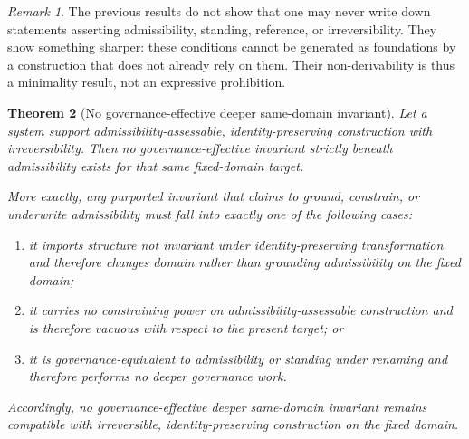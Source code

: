 \documentclass[11pt]{article}
\newtheorem{theorem}{Theorem}[section]
\theoremstyle{definition}
\theoremstyle{remark}
\newtheorem{remark}[theorem]{Remark}
\begin{document}
\begin{remark}
The previous results do not show that one may never write down statements asserting admissibility, standing, reference, or irreversibility. They show something sharper: these conditions cannot be generated as foundations by a construction that does not already rely on them. Their non-derivability is thus a minimality result, not an expressive prohibition.
\end{remark}
\begin{theorem}[No governance-effective deeper same-domain invariant]\label{thm:no-deeper-invariant}
Let a system support admissibility-assessable, identity-preserving construction with irreversibility. Then no governance-effective invariant strictly beneath admissibility exists for that same fixed-domain target.

More exactly, any purported invariant that claims to ground, constrain, or underwrite admissibility must fall into exactly one of the following cases:
\begin{enumerate}[label=(\roman*)]
\item it imports structure not invariant under identity-preserving transformation and therefore changes domain rather than grounding admissibility on the fixed domain;
\item it carries no constraining power on admissibility-assessable construction and is therefore vacuous with respect to the present target; or
\item it is governance-equivalent to admissibility or standing under renaming and therefore performs no deeper governance work.
\end{enumerate}
Accordingly, no governance-effective deeper same-domain invariant remains compatible with irreversible, identity-preserving construction on the fixed domain.
\end{theorem}
\end{document}
